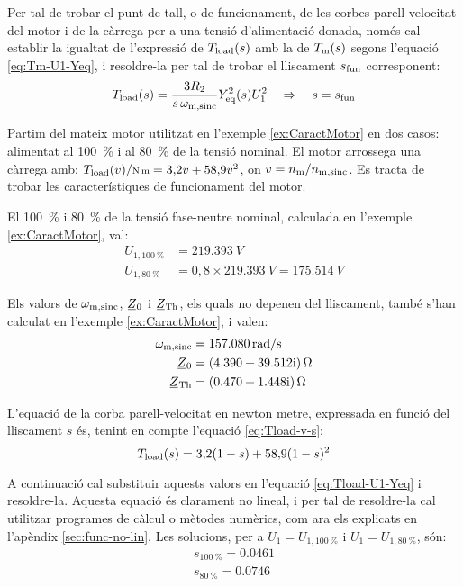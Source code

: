 Per tal de trobar el punt de tall, o de funcionament, de les corbes parell-velocitat del motor i de la càrrega per a una tensió d'alimentació donada, només cal establir la igualtat de l'expressió de $T_\mathrm{load}(s)$ amb la de $T_\mathrm{m}(s)$ segons l'equació \eqref{eq:Tm-U1-Yeq}, i resoldre-la per tal de trobar el lliscament $s_\mathrm{fun}$ corresponent:
\begin{equation}\label{eq:Tload-U1-Yeq}
	T_\mathrm{load}(s) = \frac{3 R_2}{s\,\omega_\mathrm{m,sinc}} Y_\mathrm{eq}^2(s) U_1^2 \quad\Rightarrow \quad s=s_\mathrm{fun}
\end{equation}


\begin{exemple}\label{ex:MotTensRedSolEx}
	\addcontentsxms{\MotTensRedSolEx}
	Partim del mateix motor utilitzat en l'exemple \vref{ex:CaractMotor} en dos casos: alimentat al \qty{100}{\%} i al \qty{80}{\%} de la tensió nominal. El motor arrossega una càrrega amb: $T\ped{load}(v) /{\scriptstyle \unit{N.m}} = 3{,}2 v + 58{,}9 v^2$, on $v = n_\mathrm{m}/n_\mathrm{m,sinc}$. Es tracta de trobar les característiques de funcionament del motor.
	
	El \qty{100}{\%} i \qty{80}{\%} de la tensió fase-neutre nominal, calculada  en l'exemple \ref{ex:CaractMotor}, val:
	\begin{align*}
		U_{1,\qty{100}{\%}} &= \qty{219,393}{V} \\
		U_{1,\qty{80}{\%}} &= 0{,}8\times\qty{219,393}{V} = \qty{175,514}{V}
	\end{align*}

	Els valors de $\omega_\mathrm{m,sinc}$, $\cmplx{Z}_0$ i  $\cmplx{Z}\ped{Th}$, els quals no depenen del lliscament, també s'han calculat en  l'exemple \ref{ex:CaractMotor}, i valen:
	\vspace{-2mm}
	\begin{align*}
		\omega\ped{m,sinc} &=  \qty{157,080}{rad/s} \\
		\cmplx{Z}_0 &=  \complexqty{4,390+j39,512}{\ohm} \\
		\cmplx{Z}\ped{Th} &= \complexqty{0,470+j1,448}{\ohm} 
	\end{align*}
	
	L'equació de la corba parell-velocitat en newton metre, expressada en funció del lliscament $s$ és, tenint en compte l'equació \eqref{eq:Tload-v-s}:
	\[
		T_\mathrm{load}(s) = 3{,}2 (1-s) + 58{,}9 (1-s)^2
	\]

	A continuació cal substituir aquests valors en l'equació \eqref{eq:Tload-U1-Yeq} i resoldre-la. Aquesta equació és clarament no lineal, i per tal de resoldre-la cal utilitzar programes de càlcul o mètodes numèrics, com ara els explicats en l'apèndix \ref{sec:func-no-lin}. Les solucions, per a $U_1=U_{1,\qty{100}{\%}}$ i $U_1=U_{1,\qty{80}{\%}}$, són:
	\begin{align*}
		s_{\qty{100}{\%}} = \num{0,0461} \\
	 	s_{\qty{80}{\%}}= \num{0,0746}
	\end{align*}	
	

\end{exemple}
